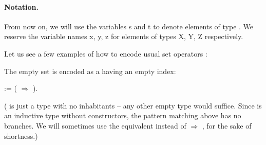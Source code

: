 \noindent\paragraph{Notation.} From now on, we will use the variables \var s and \var t to denote elements of type . We reserve the variable names \var x, \var y, \var z for elements of types \var X, \var Y, \var Z respectively.

Let us see a few examples of how to encode usual set operators \TODO{}:

\begin{example}
  The empty set is encoded as a  having an empty index:

  \begin{coqdoccode}
    \coqdocnoindent
      :=   (  \ensuremath{\Rightarrow}    ).\coqdoceol
    \coqdocemptyline
  \end{coqdoccode}
  ( is just a type with no inhabitants -- any other empty type would suffice. Since  is an inductive type without constructors, the pattern matching above has no branches. We will sometimes use the equivalent  \coqdocvar{\_} instead of   \ensuremath{\Rightarrow}    , for the sake of shortness.)
\end{example}

